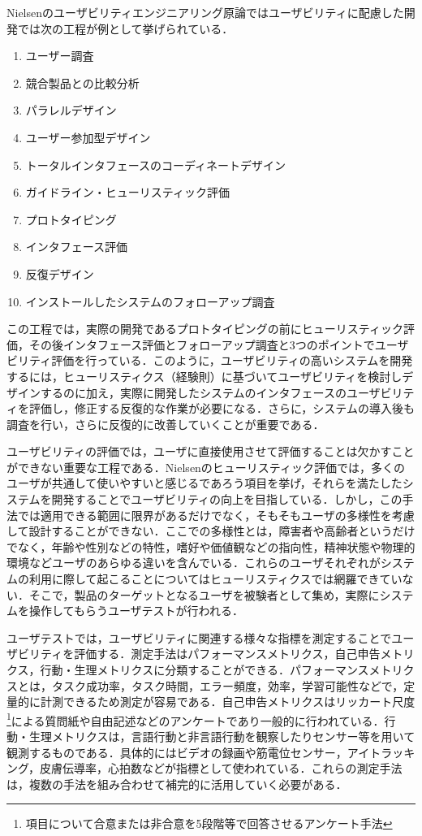 Nielsenのユーザビリティエンジニアリング原論ではユーザビリティに配慮した開発では次の工程が例として挙げられている\cite{nielsen2002}．
\begin{enumerate}
  \item ユーザー調査
  \item 競合製品との比較分析
  \item パラレルデザイン
  \item ユーザー参加型デザイン
  \item トータルインタフェースのコーディネートデザイン
  \item ガイドライン・ヒューリスティック評価
  \item プロトタイピング
  \item インタフェース評価
  \item 反復デザイン
  \item インストールしたシステムのフォローアップ調査
\end{enumerate}
この工程では，実際の開発であるプロトタイピングの前にヒューリスティック評価，その後インタフェース評価とフォローアップ調査と3つのポイントでユーザビリティ評価を行っている．このように，ユーザビリティの高いシステムを開発するには，ヒューリスティクス（経験則）に基づいてユーザビリティを検討しデザインするのに加え，実際に開発したシステムのインタフェースのユーザビリティを評価し，修正する反復的な作業が必要になる．さらに，システムの導入後も調査を行い，さらに反復的に改善していくことが重要である．

ユーザビリティの評価では，ユーザに直接使用させて評価することは欠かすことができない重要な工程である．Nielsenのヒューリスティック評価\cite{nielsen1990}では，多くのユーザが共通して使いやすいと感じるであろう項目を挙げ，それらを満たしたシステムを開発することでユーザビリティの向上を目指している．しかし，この手法では適用できる範囲に限界があるだけでなく，そもそもユーザの多様性を考慮して設計することができない．ここでの多様性とは，障害者や高齢者というだけでなく，年齢や性別などの特性，嗜好や価値観などの指向性，精神状態や物理的環境などユーザのあらゆる違いを含んでいる\cite{kurosu2013}．これらのユーザそれぞれがシステムの利用に際して起こることについてはヒューリスティクスでは網羅できていない．そこで，製品のターゲットとなるユーザを被験者として集め，実際にシステムを操作してもらうユーザテストが行われる．

ユーザテストでは，ユーザビリティに関連する様々な指標を測定することでユーザビリティを評価する．測定手法はパフォーマンスメトリクス，自己申告メトリクス，行動・生理メトリクスに分類することができる\cite{tullis2014}．パフォーマンスメトリクスとは，タスク成功率，タスク時間，エラー頻度，効率，学習可能性などで，定量的に計測できるため測定が容易である．自己申告メトリクスはリッカート尺度\footnote{項目について合意または非合意を5段階等で回答させるアンケート手法}による質問紙や自由記述などのアンケートであり一般的に行われている．行動・生理メトリクスは，言語行動と非言語行動を観察したりセンサー等を用いて観測するものである．具体的にはビデオの録画や筋電位センサー，アイトラッキング，皮膚伝導率，心拍数などが指標として使われている\cite{tullis2014}．これらの測定手法は，複数の手法を組み合わせて補完的に活用していく必要がある．


